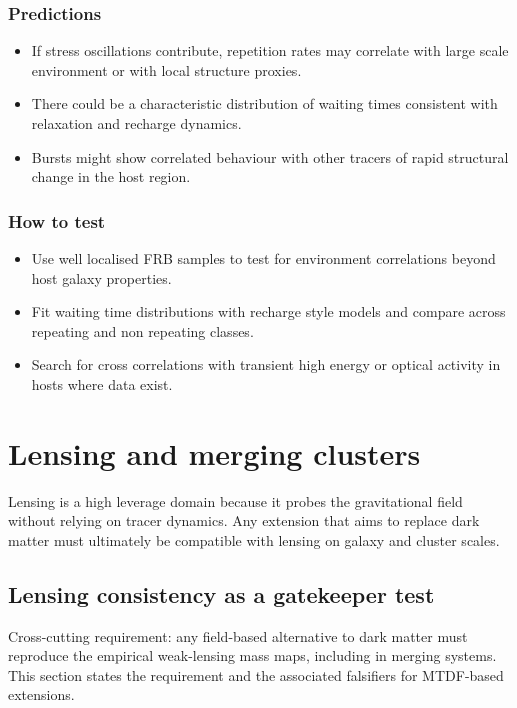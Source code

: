 \documentclass[11pt,a4paper]{article}
\begin{document}
\subsubsection{Predictions}
\begin{itemize}
  \item If stress oscillations contribute, repetition rates may correlate with large scale environment or with local structure proxies.
  \item There could be a characteristic distribution of waiting times consistent with relaxation and recharge dynamics.
  \item Bursts might show correlated behaviour with other tracers of rapid structural change in the host region.
\end{itemize}

\subsubsection{How to test}
\begin{itemize}
  \item Use well localised FRB samples to test for environment correlations beyond host galaxy properties.
  \item Fit waiting time distributions with recharge style models and compare across repeating and non repeating classes.
  \item Search for cross correlations with transient high energy or optical activity in hosts where data exist.
\end{itemize}

\section{Lensing and merging clusters}
\label{sec:lensing}
Lensing is a high leverage domain because it probes the gravitational field without relying on tracer dynamics. Any extension that aims to replace dark matter must ultimately be compatible with lensing on galaxy and cluster scales.

\subsection{Lensing consistency as a gatekeeper test}
\begin{mdframed}[linecolor=accent,linewidth=0.5pt,backgroundcolor=callout-bg,leftline=true,rightline=true,topline=true,bottomline=true,innerleftmargin=8pt,innerrightmargin=8pt,innertopmargin=6pt,innerbottommargin=6pt]
Cross-cutting requirement: any field-based alternative to dark matter must reproduce the empirical weak-lensing mass maps, including in merging systems. This section states the requirement and the associated falsifiers for MTDF-based extensions.
\end{mdframed}
\end{document}
